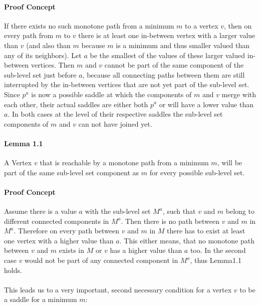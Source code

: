 \documentclass[%
	paper=A4,					%
	twoside=true,				%
	openright,					%
	parskip=full,				%
	chapterprefix=true,			%
	11pt,						%
	headings=normal,			%
	bibliography=totoc,			%
	listof=totoc,				%
	titlepage=on,				%
	captions=tableabove,		%
	draft=false,				%
]{scrreprt}%
\begin{document}
\paragraph{Proof Concept} 
If there exists no such monotone path from a minimum \(m\) to a vertex \(v\), then on every path from \(m\) to \(v\) there is at least one in-between vertex with a larger value than \(v\) (and also than \(m\) because \(m\) is a minimum and thus smaller valued than any of its neighbors). Let \(a\) be the smallest of the values of these larger valued in-between vertices. Then \(m\) and \(v\) cannot be part of the same component of the sub-level set just before \(a\), because all connecting paths between them are still interrupted by the in-between vertices that are not yet part of the sub-level set. Since \(p^{a}\) is now a possible saddle at which the components of \(m\) and \(v\) merge with each other, their actual saddles are either both \(p^a\) or will have a lower value than \(a\). In both cases at the level of their respective saddles the sub-level set components of \(m\) and \(v\) can not have joined yet.

\paragraph{Lemma 1.1} A Vertex \(v\) that is reachable by a monotone path from a minimum \(m\), will be part of the same sub-level set component as \(m\) for every possible sub-level set.

\paragraph{Proof Concept}
Assume there is a value \(a\) with the sub-level set \(M^a\), such that \(v\) and \(m\) belong to different connected components in \(M^a\). Then there is no path between \(v\) and \(m\) in \(M^a\). Therefore on every path between \(v\) and \(m\) in \(M\) there has to exist at least one vertex with a higher value than \(a\). This either means, that no monotone path between \(v\) and \(m\) exists in \(M\) or \(v\) has a higher value than \(a\) too. In the second case \(v\) would not be part of any connected component in \(M^a\), thus Lemma1.1 holds.

\paragraph{}
This leads us to a very important, second necessary condition for a vertex \(v\) to be a saddle for a minimum \(m\):
\end{document}
